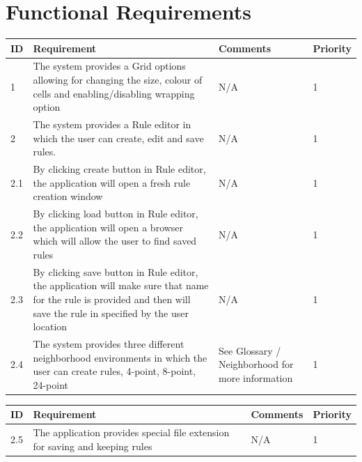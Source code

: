 \documentclass{article}
\begin{document}
\section{Functional Requirements}


\begin{center}

	\begin{tabular}{| l | p{7cm} | p{5cm} | l |}
	
		\hline
	  	ID & Requirement & Comments & Priority \\

		\hline
		
		1 & 
		The system provides a Grid options
		allowing for changing the size, colour of cells and
		enabling/disabling wrapping option&
		N/A &
		1 
		\\ \hline

		2 & 
		The system provides a Rule editor in which
		the user can create, edit and save rules. & 
		N/A &
		1 
		\\ \hline
		
		2.1 & 
		By clicking create button in Rule editor, the application will open a fresh rule
		creation window & 
		N/A &
		1 
		\\ \hline

		2.2 & 
		By clicking load button in Rule editor, the application will open a browser which
		will allow the user to find saved rules & 
		N/A &
		1 
		\\ \hline

		2.3 & 
		By clicking save button in Rule editor, the application will make sure that name for the
		rule is provided and then will save the rule in specified by the user location & 
		N/A &
		1 
		\\ \hline

		2.4 & 
		The system provides three different neighborhood environments
		in which the user can create rules, 4-point, 8-point, 24-point  & 
		See Glossary / Neighborhood for more information &
		1 
		\\ \hline


	  \hline
	\end{tabular}

	\begin{tabular}{| l | p{7cm} | p{5cm} | l |}
	
		\hline
	  	ID & Requirement & Comments & Priority \\

		\hline
		2.5 & 
		The application provides special file extension for saving and keeping rules & 
		N/A &
		1 
		\\ \hline
				

\end{tabular}
\end{center}
\end{document}
